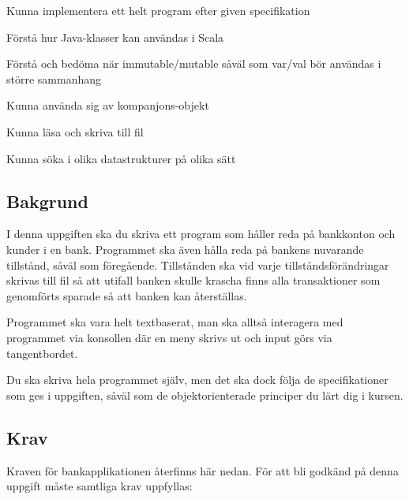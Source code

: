 

\begin{Goals}
\item Kunna implementera ett helt program efter given specifikation
\item Förstå hur Java-klasser kan användas i Scala
\item Förstå och bedöma när immutable/mutable såväl som var/val bör användas i större sammanhang
\item Kunna använda sig av kompanjons-objekt
\item Kunna läsa och skriva till fil
\item Kunna söka i olika datastrukturer på olika sätt
\end{Goals}

\subsection{Bakgrund}

I denna uppgiften ska du skriva ett program som håller reda på bankkonton och kunder i en bank. Programmet ska även hålla reda på bankens nuvarande tillstånd, såväl som föregående.
Tillstånden ska vid varje tillståndsförändringar skrivas till fil så att utifall banken skulle krascha finns alla transaktioner som genomförts sparade så att banken kan återställas.

Programmet ska vara helt textbaserat, man ska alltså interagera med programmet via konsollen där en meny skrivs ut och input görs via tangentbordet.

Du ska skriva hela programmet själv, men det ska dock följa de specifikationer som ges i uppgiften, såväl som de objektorienterade principer du lärt dig i kursen.

\subsection{Krav}

Kraven för bankapplikationen återfinns här nedan. För att bli godkänd på denna uppgift måste samtliga krav uppfyllas:

